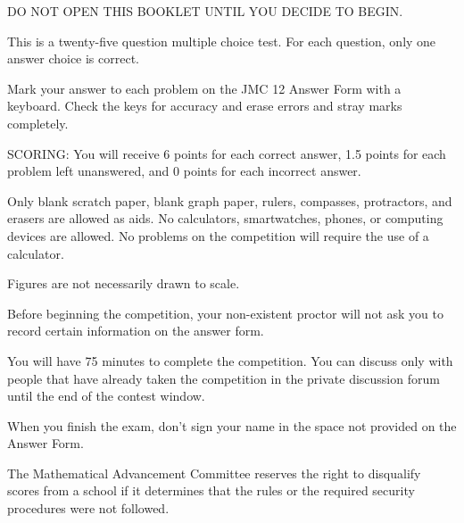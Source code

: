\documentclass[10pt, twoside]{article}
\newcommand{\contestNumber}{12}
\begin{document}
\begin{justify}
\begin{enumerate}[noitemsep, nolistsep, leftmargin=*]

\small{
\item DO NOT OPEN THIS BOOKLET UNTIL YOU DECIDE TO BEGIN.
\item This is a twenty-five question multiple choice test. For each question, only one answer choice is correct.
\item Mark your answer to each problem on the JMC {\contestNumber} Answer Form with a keyboard. Check the keys for accuracy and erase errors and stray marks completely.
\item SCORING: You will receive 6 points for each correct answer, 1.5 points for each problem left unanswered, and 0 points for each incorrect answer.
\item Only blank scratch paper, blank graph paper, rulers, compasses, protractors, and erasers are allowed as aids. No calculators, smartwatches, phones, or computing devices are allowed. No problems on the competition will require the use of a calculator.
\item Figures are not necessarily drawn to scale.
\item Before beginning the competition, your non-existent proctor will not ask you to record certain information on the answer form. 
\item You will have 75 minutes to complete the competition. You can discuss only with people that have already taken the competition in the private discussion forum until the end of the contest window.
\item When you finish the exam, don't sign your name in the space not provided on the Answer Form.
}

\end{enumerate}

\vspace{-4mm}

\begin{center} \noindent\hrulefill \end{center}

\vspace{-5mm}

\small{
\begin{justify}
The Mathematical Advancement Committee reserves the right to disqualify scores from a school if it determines that the rules or the required security procedures were not followed.
\end{justify}

}
\end{justify}
\end{document}
